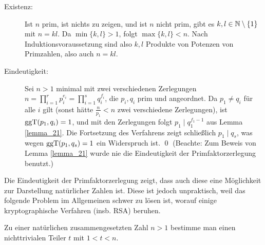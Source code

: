 	\begin{description}
		\item[Existenz:] Ist $n$ prim, ist nichts zu zeigen, und ist $n$ nicht prim, gibt es $k, l \in \mathbb{N} \setminus \{1\}$ mit $n = kl$. Da $\min\{k,l\} > 1$, folgt $\max \{k,l\} < n$. Nach Induktionsvoraussetzung sind also $k,l$ Produkte von Potenzen von Primzahlen, also auch $n = kl$.
		\item[Eindeutigkeit:] Sei $n > 1$ minimal mit zwei verschiedenen Zerlegungen $n = \prod\limits_{i=1}^{r} p_i^{e_i} = \prod\limits_{i=1}^{s} q_i^{f_i}$, die $p_i, q_i$ prim und angeordnet. Da $p_1 \neq q_i$ für alle $i$ gilt (sonst hätte $\frac{n}{p_1} < n$ zwei verschiedene Zerlegungen), ist $\operatorname{ggT}(p_1,q_i) = 1$, und mit den Zerlegungen folgt $p_1 \mid q_1^{f_1 - 1}$ aus Lemma \ref{lemma_21}. Die Fortsetzung des Verfahrens zeigt schließlich $p_1 \mid q_s$, was wegen $\operatorname{ggT}(p_1,q_s) = 1$ ein Widerspruch ist. \qed
		(Beachte: Zum Beweis von Lemma \ref{lemma_21} wurde nie die Eindeutigkeit der Primfaktorzerlegung benutzt.)
	\end{description}

Die Eindeutigkeit der Primfaktorzerlegung zeigt, dass auch diese eine Möglichkeit zur Darstellung natürlicher Zahlen ist. Diese ist jedoch unpraktisch, weil das folgende Problem im Allgemeinen schwer zu lösen ist, worauf einige kryptographische Verfahren (insb. RSA) beruhen.

\begin{defn}[Faktorisierungsproblem]
	Zu einer natürlichen zusammengesetzten Zahl $n > 1$ bestimme man einen nichttrivialen Teiler $t$ mit $1 < t < n$.
\end{defn}

